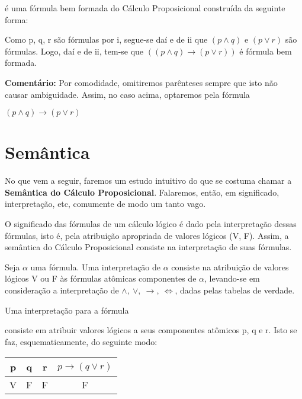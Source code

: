 \begin{exemplo}
     é uma fórmula bem formada do Cálculo Proposicional construída da seguinte forma:
\end{exemplo}

Como p, q, r são fórmulas por i, segue-se daí e de ii que $(p \land q)$ e $(p \lor r)$ são fórmulas.
Logo, daí e de ii, tem-se que $((p \land q) \to (p \lor r))$ é fórmula bem formada.

\bigskip

\noindent \textbf{Comentário:} Por comodidade, omitiremos parênteses sempre que isto não causar ambiguidade.
Assim, no caso acima, optaremos pela fórmula


\centerline{$(p \land q) \to (p \lor r)$}

\section{Semântica}
\setcounter{exemplo}{0}
No que vem a seguir, faremos um estudo intuitivo do que se costuma chamar a \textbf{Semântica do Cálculo Proposicional}.
Falaremos, então, em significado, interpretação, etc, comumente de modo um tanto vago.

O significado das fórmulas de um cálculo lógico é dado pela interpretação dessas fórmulas, isto é, pela atribuição apropriada de valores lógicos (V, F).
Assim, a semântica do Cálculo Proposicional consiste na interpretação de suas fórmulas.

Seja $\alpha$ uma fórmula.
Uma interpretação de $\alpha$ consiste na atribuição de valores lógicos V ou F às fórmulas atômicas componentes de $\alpha$, levando-se em consideração a interpretação de $\land,\ \lor,\ \to,\ \iff$, dadas pelas tabelas de verdade.

\begin{exemplo}
    Uma interpretação para a fórmula 
\end{exemplo}
\noindent consiste em atribuir valores lógicos a seus componentes atômicos p, q e r.
Isto se faz, esquematicamente, do seguinte modo:

\begin{center}
    \begin{tabular}{c c c c}
        p & q & r & $p \to (q \lor r)$ \\ \hline
        V & F & F & F
    \end{tabular}
\end{center}

